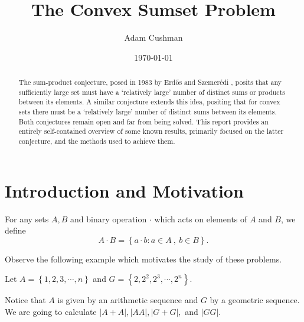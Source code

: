 \documentclass[12pt,reqno]{amsart}
\begin{document}
\title{The Convex Sumset Problem} 

\author[Cushman]{Adam Cushman}
\address{College of Arts and Sciences\\
         Indiana University,
         Bloomington, IN 47405
         USA} 
\date{\today}

\begin{abstract}
The sum-product conjecture, posed in 1983 by Erd{\H{o}}s and Szemer{\'e}di \cite{erdos-szemeredi}, 
posits that any sufficiently large set must have a `relatively large' number
of distinct sums or products between its elements.
A similar conjecture extends this idea, positing that for convex sets there must be a `relatively large'
number of distinct sums between its elements. Both conjectures remain open and far from being solved.
This report provides an entirely self-contained overview of some known results, primarily focused on the
latter conjecture, and the methods used to achieve them.
\end{abstract}

\maketitle


\section{Introduction and Motivation} 

For any sets \(A,B\) and binary operation \(\cdot \) which acts on elements of \(A\) and \(B\), we define
\[
    A \cdot  B = \left\{ a \cdot  b : a \in A~,~ b \in B \right\} 
.\]

Observe the following example which motivates the study of these problems.

Let \(A = \left\{ 1, 2, 3, \cdots, n \right\}\) and \(G = \left\{ 2, 2^{2}, 2^{3}, \cdots , 2^{n} \right\}\).

Notice that \(A\) is given by an arithmetic sequence and \(G\) by a geometric sequence.
We are going to calculate \(\left\lvert A+A \right\rvert , \left\lvert AA \right\rvert , \left\lvert G+G \right\rvert ,\) and \(\left\lvert GG \right\rvert \).
\end{document}
